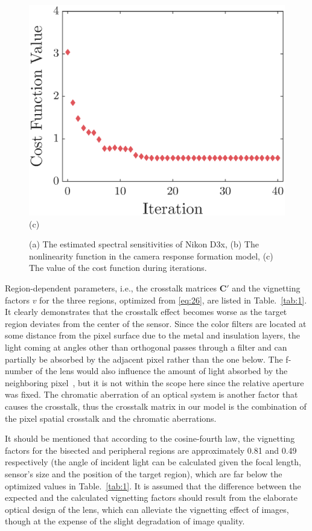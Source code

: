 \documentclass[9pt,twocolumn,twoside]{osajnl}
\begin{document}
\begin{figure}[tbp]
	\begin{minipage}[b]{0.5\linewidth}
		\centering
		\includegraphics[width=\linewidth]{Fig10c}\\
		(c)
	\end{minipage}
	\caption{(a) The estimated spectral sensitivities of Nikon D3x, (b) The nonlinearity function in the camera response formation model, (c) The value of the cost function during iterations.}
	\label{fig:10}
\end{figure}

Region-dependent parameters, i.e., the crosstalk matrices $\mathbf{C}'$ and the vignetting factors $v$ for the three regions, optimized from \eqref{eq:26}, are listed in Table.~\ref{tab:1}. It clearly demonstrates that the crosstalk effect becomes worse as the target region deviates from the center of the sensor. Since the color filters are located at some distance from the pixel surface due to the metal and insulation layers, the light coming at angles other than orthogonal passes through a filter and can partially be absorbed by the adjacent pixel rather than the one below. The f-number of the lens would also influence the amount of light absorbed by the neighboring pixel~\cite{Agranov:03}, but it is not within the scope here since the relative aperture was fixed. The chromatic aberration of an optical system is another factor that causes the crosstalk, thus the crosstalk matrix in our model is the combination of the pixel spatial crosstalk and the chromatic aberrations.

It should be mentioned that according to the cosine-fourth law, the vignetting factors for the bisected and peripheral regions are approximately 0.81 and 0.49 respectively (the angle of incident light can be calculated given the focal length, sensor’s size and the position of the target region), which are far below the optimized values in Table.~\ref{tab:1}. It is assumed that the difference between the expected and the calculated vignetting factors should result from the elaborate optical design of the lens, which can alleviate the vignetting effect of images, though at the expense of the slight degradation of image quality.
\end{document}
